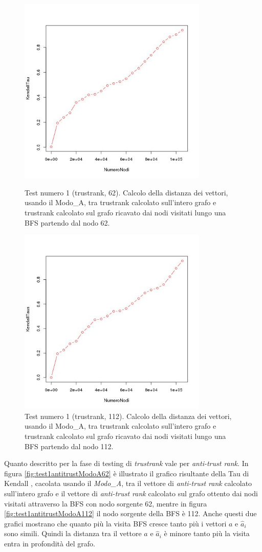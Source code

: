   \begin{figure}
\centering
 \includegraphics[height=9cm]{immagini/test1/trustranktestMode0_62}
 \caption{Test numero 1 (trustrank, 62). Calcolo della distanza dei vettori, usando il Modo\_A, tra trustrank calcolato sull'intero grafo e trustrank calcolato sul grafo ricavato dai nodi visitati lungo una BFS partendo dal nodo 62.}
 \label{fig:test1trustModoA62}
\centering
 \includegraphics[height=9cm]{immagini/test1/trustranktestMode0_112}
 \caption{Test numero 1 (trustrank, 112). Calcolo della distanza dei vettori, usando il Modo\_A, tra trustrank calcolato sull'intero grafo e trustrank calcolato sul grafo ricavato dai nodi visitati lungo una BFS partendo dal nodo 112.}
 \label{fig:test1trustModoA112}
\end{figure}
 
Quanto descritto per la fase di testing di \textit{trustrank} vale per \textit{anti-trust rank}. In figura \ref{fig:test1antitrustModoA62} è illustrato il grafico risultante della Tau di Kendall , cacolata usando il \textit{Modo\_A}, tra il vettore di \textit{anti-trust rank} calcolato sull'intero grafo e il vettore di \textit{anti-trust rank} calcolato sul grafo ottento dai nodi visitati attraverso la BFS con nodo sorgente 62, mentre in figura \ref{fig:test1antitrustModoA112} il nodo sorgente della BFS è 112. Anche questi due grafici mostrano che quanto più la visita BFS cresce tanto più i vettori \(a\) e \(\hat{a}_i\) sono simili. Quindi la distanza tra il vettore \(a\) e \(\hat{a}_i\) è minore tanto più la visita entra in profondità del grafo.

